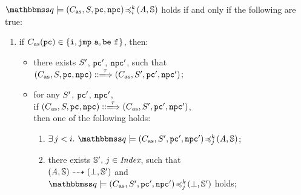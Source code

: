 \begin{definition}
    \label{def:sim-imp-prim-state}
    {\em $\simFunctionSt{\relastQ}{(\asmimp, \state, \pc, \npc)}{i}{k}{(\primcom, \hpstate)}$}
    holds if and only if the following are true:
    \small
    \begin{enumerate}[1.]
        \item if {\em $C_{\text{as}}(\texttt{pc}) \in \{ \texttt{i}, \texttt{jmp}{} \ \texttt{a}, \texttt{be} \ \texttt{f}_{} \}$}, then:
            \begin{itemize}
                \item there exists {\em $S'$}, {\em $\texttt{pc}'$}, {\em $\texttt{npc}'$},
                    such that \\
                    {\em $\LGlobTrans{(\asmimp, \state, \pc, \npc)}{\empmsg\,}
                            {(\asmimp, \state', \pc', \npc')}$};
                \item for any $S'$, {\em $\texttt{pc}'$}, {\em $\texttt{npc}'$}, \\
                    if
                    {\em $\LGlobTrans{(\asmimp, \state, \pc, \npc)}{\empmsg\,}
                            {(\asmimp, \state', \pc', \npc')}$}, \\ then one of
                        the following holds:
                    \begin{enumerate}
                        \item {\em $\exists \, j < i. \
                            \simFunctionSt{\relastQ}{(\asmimp, \state', \pc', \npc')}
                                {j}{k}{(\primcom, \hpstate)}$};
                        \item there exists $\mathbb{S}', \, j \in \textit{Index}$,
                            such that \\
                            ${(\textit{A}, \mathbb{S})} \dashrightarrow {(\perp, \mathbb{S}')}$
                            and \\
                            {\em $\simFunctionSt{\relastQ}{(\asmimp, \state', \pc', \npc')}
                                    {j}{k}{(\primdone, \hpstate')}$} holds;
                    \end{enumerate}
            \end{itemize}
            \vspace{0.5em}


\end{enumerate}
\end{definition}
